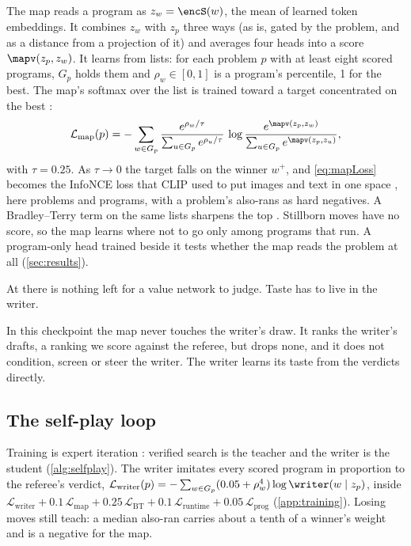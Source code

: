 The map reads a program as $z_w=\encS(w)$, the mean of learned token embeddings. It combines $z_w$
with $z_p$ three ways (as is, gated by the problem, and as a distance from a projection of it) and
averages four heads into a score $\mapv(z_p,z_w)$. It learns from lists: for each problem $p$ with
at least eight scored programs, $G_p$ holds them and $\rho_w\in[0,1]$ is a program's percentile, 1
for the best. The map's softmax over the list is trained toward a target concentrated on the best
\citep{cao2007listnet}:
\begin{equation}
  \mathcal{L}_{\text{map}}(p)=-\sum_{w\in G_p}
  \frac{e^{\rho_w/\tau}}{\sum_{u\in G_p}e^{\rho_u/\tau}}\,
  \log\frac{e^{\mapv(z_p,z_w)}}{\sum_{u\in G_p}e^{\mapv(z_p,z_u)}},
  \label{eq:mapLoss}
\end{equation}
with $\tau=0.25$. As $\tau\to0$ the target falls on the winner $w^+$, and \cref{eq:mapLoss} becomes
the InfoNCE loss \citep{oord2018cpc} that CLIP used to put images and text in one space
\citep{radford2021clip}, here problems and programs, with a problem's also-rans as hard negatives.
A Bradley--Terry term on the same lists sharpens the top \citep{bradley1952rank}. Stillborn moves
have no score, so the map learns where not to go only among programs that run. A program-only head
trained beside it tests whether the map reads the problem at all (\cref{sec:results}).

\begin{keyidea}
At \searchone{} there is nothing left for a value network to judge. Taste has to live in the
writer.
\end{keyidea}

In this checkpoint the map never touches the writer's draw. It ranks the writer's drafts, a
ranking we score against the referee, but drops none, and it does not condition, screen or steer
the writer. The writer learns its taste from the verdicts directly.

\subsection{The self-play loop}\label{sub:method-selfplay}

Training is expert iteration \citep{anthony2017expert}: verified search is the teacher and the
writer is the student (\cref{alg:selfplay}). The writer imitates every scored program in proportion
to the referee's verdict,
$\mathcal{L}_{\text{writer}}(p)=-\sum_{w\in G_p}(0.05+\rho_w^{4})\log\writer(w\mid z_p)$, inside
$\mathcal{L}_{\text{writer}}+0.1\,\mathcal{L}_{\text{map}}+0.25\,\mathcal{L}_{\text{BT}}
+0.1\,\mathcal{L}_{\text{runtime}}+0.05\,\mathcal{L}_{\text{prog}}$ (\cref{app:training}). Losing
moves still teach: a median also-ran carries about a tenth of a winner's weight and is a negative for the
map.

